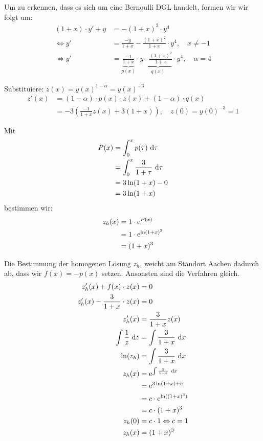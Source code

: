 \documentclass[main.tex]{subfiles}
\begin{document}
Um zu erkennen, dass es sich um eine Bernoulli DGL handelt, formen wir wir folgt um: 
\begin{align*}
	(1+x)\cdot y' + y &= - (1+x)^2\cdot y^4 \\
\Leftrightarrow	y' &= \frac{-y}{1+x} - \frac{(1+x)^2}{1+x} \cdot y^4, \quad x\neq -1 \\
\Leftrightarrow	y' &= \underbrace{\frac{-1}{1+x}}_{p(x)} \cdot y \underbrace{- \frac{(1+x)^2}{1+x}}_{q(x)} \cdot y^4, \quad \alpha = 4
\end{align*}

Substituiere: $z(x) = y(x)^{1-\alpha} = y(x)^{-3}$
\begin{align*}
	z'(x) &= (1-\alpha)\cdot p(x) \cdot z(x) + (1-\alpha)\cdot q(x)\\
		  &= -3(\frac{-1}{1+x} z(x) +3 (1+x)), \quad z(0)=y(0)^{-3}=1
\end{align*}

Mit
\begin{align*}
	P(x) &= \int^x_0 p(\tau) ~\mathrm{d}\tau\\
	&= \int^x_0 \frac{3}{1+\tau}~\mathrm{d}\tau\\
	&= 3\ln(1+x) - 0 \\
	&= 3\ln(1+x)
\end{align*}
bestimmen wir:
\begin{align*}
	z_h(x) &= 1\cdot \operatorname{\mathrm{e}}^{P(x)} \\
		   &= 1\cdot \operatorname{\mathrm{e}}^{\ln(1+x)^3} \\
		   &= (1+x)^3
\end{align*}

Die Bestimmung der homogenen Lösung $z_h$, weicht am Standort Aachen dadurch ab, dass wir $f(x) = -p(x)$ setzen. Ansonsten sind die Verfahren gleich. 
\begin{align*}
	z_h'(x) + f(x)\cdot z(x) &= 0 \\
	z_h'(x) - \frac{3}{1+x}\cdot z(x) &= 0 \\
	z_h'(x) &= \frac{3}{1+x} z(x) \\
	\int \frac{1}{z}~\mathrm{d}z &= \int \frac{3}{1+x} ~\mathrm{d}x \\
	\ln(z_h) &= \int \frac{3}{1+x} ~\mathrm{d}x\\
	z_h(x) &= \operatorname{\mathrm{e}}^{\int \frac{3}{1+x}~\mathrm{d}x} \\
	  &= \operatorname{\mathrm{e}}^{3\ln(1+x)+\tilde{c}}\\
	  &= c\cdot \operatorname{\mathrm{e}}^{\ln((1+x)^3)}\\
	  &= c\cdot (1+x)^3 \\
	z_h(0) &= c\cdot 1 \Leftrightarrow c = 1 \\
	z_h(x) &= (1+x)^3
\end{align*}
\end{document}
